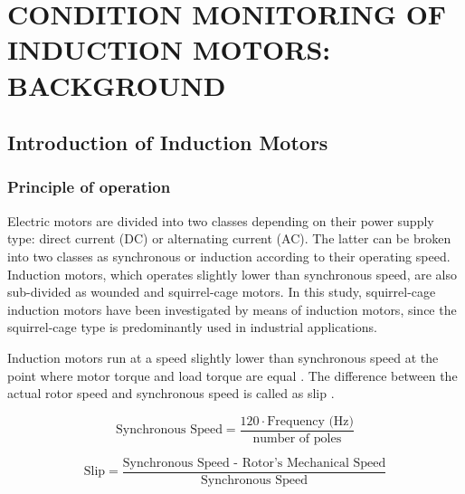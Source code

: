 \chapter{CONDITION MONITORING OF INDUCTION MOTORS: BACKGROUND }\label{Ch2}
\vspace*{-12pt} %
\section{Introduction of Induction Motors}
\subsection{Principle of operation}

Electric motors are divided into two classes depending on their power supply type: direct current (DC) or alternating current (AC). The latter can be broken into two classes as synchronous or induction according to their operating speed. Induction motors, which operates slightly lower than synchronous speed, are also sub-divided as wounded and squirrel-cage motors. In this study, squirrel-cage induction motors have been investigated by means of induction motors, since the squirrel-cage type is predominantly used in industrial applications. 

Induction motors run at a speed slightly lower than synchronous speed at the point where motor torque and load torque are equal \cite{gunnar2016}. The difference between the actual rotor speed and synchronous speed is called as slip \cite{doe2008improving}.

\begin{equation}
	\text{Synchronous Speed} = \displaystyle \frac{120 \cdot \text{Frequency (Hz)}}{\text{number of poles}}
	\label{speed}
\end{equation}

\begin{equation}
	\text{Slip} = \displaystyle \frac{\text{Synchronous Speed - Rotor's Mechanical Speed}}{\text{Synchronous Speed}}
	\label{slip}
\end{equation}


